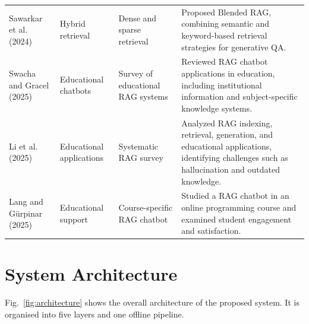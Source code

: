 \documentclass[conference]{IEEEtran}
\begin{document}
\begin{table}[!t]
\begin{tabularx}{\textwidth}{
    L{2.25cm}
    L{2.55cm}
    L{3.15cm}
    Y
}
Sawarkar et al. (2024) \cite{BlendedRAG2024} &
Hybrid retrieval &
Dense and sparse retrieval &
Proposed Blended RAG, combining semantic and keyword-based retrieval strategies for generative QA. \\

Swacha and Gracel (2025) \cite{EducationSurvey2025} &
Educational chatbots &
Survey of educational RAG systems &
Reviewed RAG chatbot applications in education, including institutional information and subject-specific knowledge systems. \\

Li et al. (2025) \cite{EducationalRAG2025} &
Educational applications &
Systematic RAG survey &
Analyzed RAG indexing, retrieval, generation, and educational applications, identifying challenges such as hallucination and outdated knowledge. \\

Lang and Gürpinar (2025) \cite{LearningSupport2025} &
Educational support &
Course-specific RAG chatbot &
Studied a RAG chatbot in an online programming course and examined student engagement and satisfaction. \\

\bottomrule
\end{tabularx}
\end{table}

\section{System Architecture}

Fig.~\ref{fig:architecture} shows the overall architecture
of the proposed system. It is organised into five layers
and one offline pipeline.
\end{document}
